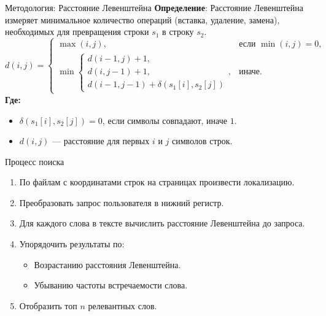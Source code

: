 \documentclass{beamer}
\begin{document}
\begin{frame}{Методология: Расстояние Левенштейна}
    \textbf{Определение}: Расстояние Левенштейна измеряет минимальное количество операций (вставка, удаление, замена), необходимых для превращения строки $s_1$ в строку $s_2$.
    \begin{equation}
        d(i, j) = \begin{cases} 
            \max(i, j), & \text{если } \min(i, j) = 0, \\
            \min\begin{cases} 
                d(i-1, j) + 1, \\
                d(i, j-1) + 1, \\
                d(i-1, j-1) + \delta(s_1[i], s_2[j])
            \end{cases}, & \text{иначе.}
        \end{cases}
    \end{equation}
    \textbf{Где:}
    \begin{itemize}
        \item $\delta(s_1[i], s_2[j]) = 0$, если символы совпадают, иначе $1$.
        \item $d(i, j)$ --- расстояние для первых $i$ и $j$ символов строк.
    \end{itemize}
\end{frame}

\begin{frame}{Процесс поиска}
    \begin{enumerate}
        \item По файлам с координатами строк на страницах произвести локализацию.
        \item Преобразовать запрос пользователя в нижний регистр.
        \item Для каждого слова в тексте вычислить расстояние Левенштейна до запроса.
        \item Упорядочить результаты по:
        \begin{itemize}
            \item Возрастанию расстояния Левенштейна.
            \item Убыванию частоты встречаемости слова.
        \end{itemize}
        \item Отобразить топ $n$ релевантных слов.
    \end{enumerate}
\end{frame}
\end{document}
